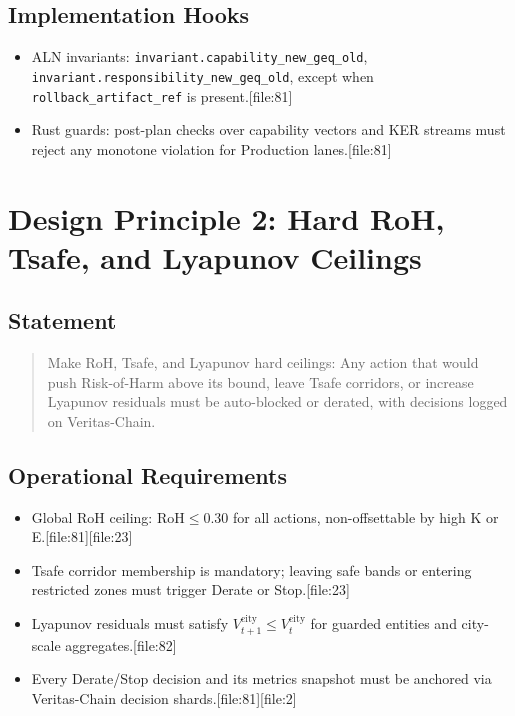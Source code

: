 \documentclass[11pt]{article}
\begin{document}
\subsection{Implementation Hooks}

\begin{itemize}[nosep]
  \item ALN invariants: \texttt{invariant.capability\_new\_geq\_old}, \texttt{invariant.responsibility\_new\_geq\_old}, except when \texttt{rollback\_artifact\_ref} is present.[file:81]
  \item Rust guards: post-plan checks over capability vectors and KER streams must reject any monotone violation for Production lanes.[file:81]
\end{itemize}

\section{Design Principle 2: Hard RoH, Tsafe, and Lyapunov Ceilings}

\subsection{Statement}

\begin{quote}
Make RoH, Tsafe, and Lyapunov hard ceilings: Any action that would push Risk-of-Harm above its bound, leave Tsafe corridors, or increase Lyapunov residuals must be auto-blocked or derated, with decisions logged on Veritas-Chain.
\end{quote}

\subsection{Operational Requirements}

\begin{itemize}[nosep]
  \item Global RoH ceiling: \( \mathrm{RoH} \leq 0.30 \) for all actions, non-offsettable by high K or E.[file:81][file:23]
  \item Tsafe corridor membership is mandatory; leaving safe bands or entering restricted zones must trigger Derate or Stop.[file:23]
  \item Lyapunov residuals must satisfy \( V_{t+1}^{\mathrm{city}} \leq V_t^{\mathrm{city}} \) for guarded entities and city-scale aggregates.[file:82]
  \item Every Derate/Stop decision and its metrics snapshot must be anchored via Veritas-Chain decision shards.[file:81][file:2]
\end{itemize}
\end{document}
